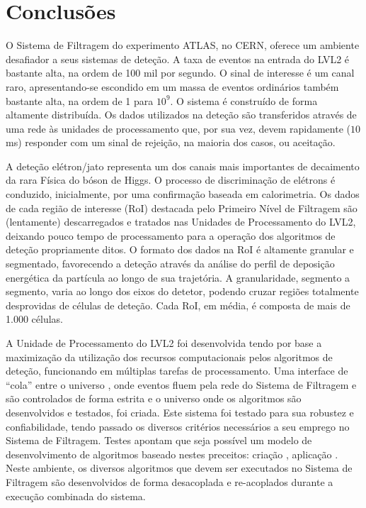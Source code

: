 \typeout{ ====================================================================}
\typeout{ ====================================================================}

\chapter{Conclusões}
\label{chap:conclusions}

O Sistema de Filtragem do experimento ATLAS, no CERN, oferece um ambiente
desafiador a seus sistemas de deteção. A taxa de eventos na entrada do LVL2 é
bastante alta, na ordem de 100 mil por segundo. O sinal de interesse é um
canal raro, apresentando-se escondido em um massa de eventos ordinários também
bastante alta, na ordem de 1 para $10^9$. O sistema é construído de forma
altamente distribuída. Os dados utilizados na deteção são transferidos através
de uma rede às unidades de processamento que, por sua vez, devem rapidamente
($10$ ms) responder com um sinal de rejeição, na maioria dos casos, ou
aceitação.

A deteção elétron/jato representa um dos canais mais importantes de decaimento
da rara Física do bóson de Higgs. O processo de discriminação de elétrons é
conduzido, inicialmente, por uma confirmação baseada em calorimetria. Os dados
de cada região de interesse (RoI) destacada pelo Primeiro Nível de Filtragem
são (lentamente) descarregados e tratados nas Unidades de Processamento do
LVL2, deixando pouco tempo de processamento para a operação dos algoritmos de
deteção propriamente ditos. O formato dos dados na RoI é altamente granular e
segmentado, favorecendo a deteção através da análise do perfil de deposição
energética da partícula ao longo de sua trajetória. A granularidade, segmento
a segmento, varia ao longo dos eixos do detetor, podendo cruzar regiões
totalmente desprovidas de células de deteção. Cada RoI, em média, é composta
de mais de 1.000 células.

A Unidade de Processamento do LVL2 foi desenvolvida tendo por base a
maximização da utilização dos recursos computacionais pelos algoritmos de
deteção, funcionando em múltiplas tarefas de processamento. Uma interface de
``cola'' entre o universo , onde eventos fluem pela rede do
Sistema de Filtragem e são controlados de forma estrita e o universo
 onde os algoritmos são desenvolvidos e testados, foi
criada. Este sistema foi testado para sua robustez e confiabilidade, tendo
passado os diversos critérios necessários a seu emprego no Sistema de
Filtragem. Testes apontam que seja possível um modelo de desenvolvimento de
algoritmos baseado nestes preceitos: criação , aplicação
. Neste ambiente, os diversos algoritmos que devem ser executados
no Sistema de Filtragem são desenvolvidos de forma desacoplada e re-acoplados
durante a execução combinada do sistema.

